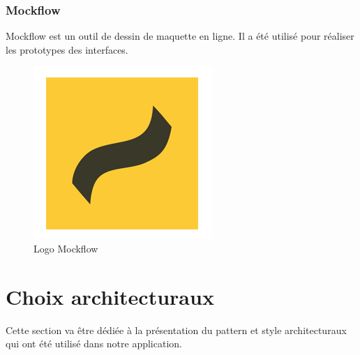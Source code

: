 \subsubsection{Mockflow}
\noindent\begin{minipage}{0.69\textwidth}
Mockflow est un outil de dessin de maquette en ligne. Il a été utilisé pour réaliser les prototypes des interfaces.
\end{minipage}
\begin{minipage}{0.3\textwidth}
\begin{figure}[H]
  \centering
  \includegraphics[scale=0.2]{figures/logo/mockflow.png}
  \caption{Logo Mockflow}
  \label{code53}
\end{figure}
\end{minipage}
\section{Choix architecturaux}
Cette section va être dédiée à la présentation du pattern et style architecturaux qui ont été utilisé dans notre application.
